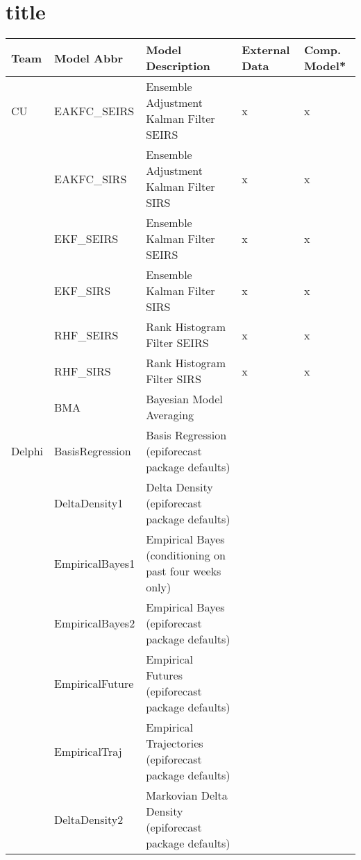\part{title}\begin{table}
\setlength{\tabcolsep}{4pt} 
\begin{tabular}{p{1.69cm} l p{7.5cm}  p{1.70cm}  p{1.7cm}}
\hline
Team     & Model Abbr& Model Description & External Data & Comp. Model* \\ 
\hline
CU       & EAKFC\_SEIRS       & Ensemble Adjustment Kalman Filter SEIRS  & x & x    \\ 

~        & EAKFC\_SIRS        & Ensemble Adjustment Kalman Filter SIRS   & x & x \\
~        & EKF\_SEIRS         & Ensemble Kalman Filter SEIRS    & x             & x                   \\
~        & EKF\_SIRS          & Ensemble Kalman Filter SIRS     & x             & x                   \\
~        & RHF\_SEIRS         & Rank Histogram Filter SEIRS     & x             & x                   \\
~        & RHF\_SIRS          & Rank Histogram Filter SIRS      & x             & x                   \\
~        & BMA                & Bayesian Model Averaging       & ~             & ~                   \\
\hline
Delphi   & BasisRegression    & Basis Regression (epiforecast package defaults) & ~             & ~                   \\ 
~        & DeltaDensity1      & Delta Density (epiforecast package defaults)    & ~             & ~                   \\ 
~        & EmpiricalBayes1    & Empirical Bayes (conditioning on past four weeks only) & ~             & ~                   \\ 
~        & EmpiricalBayes2    & Empirical Bayes (epiforecast package defaults) & ~             & ~                   \\ 
~        & EmpiricalFuture    & Empirical Futures (epiforecast package defaults)    & ~             & ~                   \\ 
~        & EmpiricalTraj      & Empirical Trajectories (epiforecast package defaults) & ~             & ~                   \\ 
~        & DeltaDensity2      & Markovian Delta Density (epiforecast package defaults) & ~             & ~                   \\ 

\end{tabular}
\end{table}
